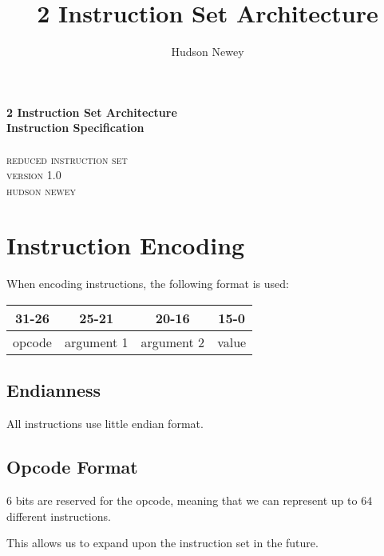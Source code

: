 \documentclass[12pt,a4paper]{article}
\title{ 2 Instruction Set Architecture }
\author{ Hudson Newey }
\begin{document}
\begin{center}
    \huge{\textbf{ 2 Instruction Set Architecture }} \\
    \huge{\textbf{ Instruction Specification }}\\
    \hspace{200pt}\\
    \textsc{ reduced instruction set } \\
    \textsc{ version 1.0 }
    \vspace{280pt}\\
    \textsc{ hudson newey }
\end{center}

\newpage
\tableofcontents
\newpage

\section{Instruction Encoding}

When encoding instructions, the following format is used:

\begin{center}
\begin{tabular}{ c c c c }
    \textbf{31-26} & \textbf{25-21} & \textbf{20-16} & \textbf{15-0} \\
    \hline
    opcode & argument 1 & argument 2 & value \\
\end{tabular}
\end{center}

\subsection{Endianness}

All instructions use little endian format.

\subsection{Opcode Format}

$6$ bits are reserved for the opcode, meaning that we can represent up to $64$
different instructions.

This allows us to expand upon the instruction set in the future.
\end{document}
